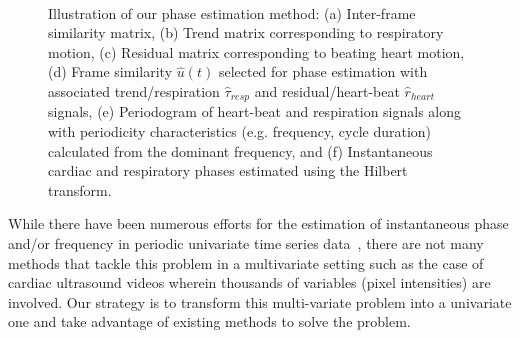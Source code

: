 \documentclass[journal]{IEEEtran}
\newcounter{lfigcounter}
\def\ionbox#1{\makebox[#1]{(\alph{lfigcounter})}\stepcounter{lfigcounter}}
\begin{document}
\begin{figure}[!t]
\ionbox{6.0in}\\
%
\caption{Illustration of our phase estimation method: (a) Inter-frame similarity matrix, (b) Trend matrix corresponding to respiratory motion, (c) Residual matrix corresponding to beating heart motion, (d) Frame similarity $\hat{u}(t)$ selected for phase estimation with associated trend/respiration $\hat{\tau}_{resp}$ and residual/heart-beat $\hat{r}_{heart}$ signals, (e) Periodogram of heart-beat and respiration signals along with periodicity characteristics (e.g. frequency, cycle duration) calculated from the dominant frequency, and (f) Instantaneous cardiac and respiratory phases estimated using the Hilbert transform.}
\label{fig:phase_estimation}
\end{figure}
%
While there have been numerous efforts for the estimation of instantaneous phase and/or frequency in periodic univariate time series data~\cite{Boashash1992,Rosenblum2001,Freund2003,Luo2003,Lu2013}, there are not many methods that tackle this problem in a multivariate setting such as the case of cardiac ultrasound videos wherein thousands of variables (pixel intensities) are involved. Our strategy is to transform this multi-variate problem into a univariate one and take advantage of existing methods to solve the problem. 
%
\end{document}
